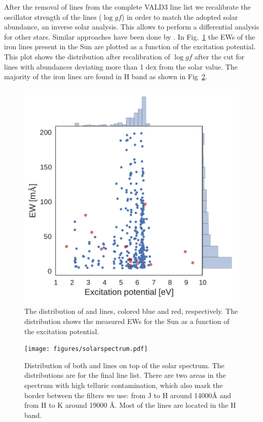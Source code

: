 \documentclass{aa}
\begin{document}
After the removal of lines from the complete VALD3 line list we
recalibrate the oscillator strength of the lines ($\log\mathit{gf}$) in
order to match the adopted solar abundance, an inverse solar analysis.
This allows to perform a differential analysis for other stars. Similar
approaches have been done by \citet{Sousa2008a,Onehag2012,Rhodin2015}.
In Fig.~\ref{fig:EWvsEP} the EWs of the iron lines present in the Sun
are plotted as a function of the excitation potential. This plot shows
the distribution after recalibration of $\log \mathit{gf}$ after the
cut for lines with abundances deviating more than 1 dex from the solar
value. The majority of the iron lines are found in H band as shown in
Fig~\ref{fig:solarspectrum}.



\begin{figure}[tpb]
    \centering
    \includegraphics[width=1.0\linewidth]{figures/EWvsEP.pdf}
    \caption{The distribution of  and  lines,
    colored blue and red, respectively. The distribution shows the
    measured EWs for the Sun as a function of the excitation potential.}
    \label{fig:EWvsEP}
\end{figure}


\begin{figure}[tpb]
    \centering
    \texttt{[image: figures/solarspectrum.pdf]}
    \caption{Distribution of both  and  lines
    on top of the solar spectrum. The distributions are for the final
    line list. There are two areas in the spectrum with high telluric
    contamination, which also mark the border between the filters we
    use: from J to H around 14000\si{\angstrom} and from H to K around
    19000 \si{\angstrom}. Most of the lines are located in the H band.}
    \label{fig:solarspectrum}
\end{figure}
\end{document}
